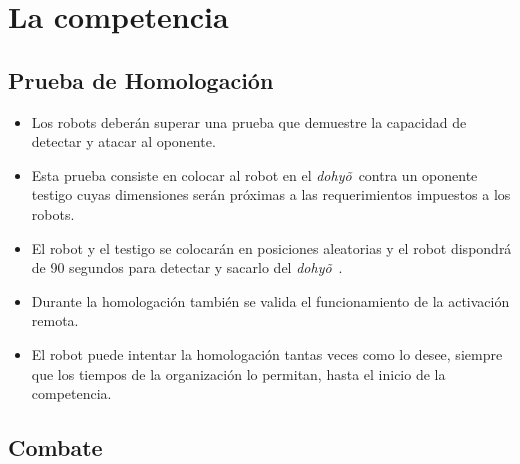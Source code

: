 \documentclass[a4paper,11pt]{article}
\newcommand{\dojo}{\emph{dohy\~{o}}~}
\begin{document}
\section*{La competencia}
\subsection*{Prueba de Homologación}
\begin{itemize}
  \item Los robots deberán superar una prueba que demuestre la capacidad de detectar y atacar al oponente.
  \item Esta prueba consiste en colocar al robot en el \dojo contra un oponente testigo cuyas dimensiones serán próximas a las requerimientos impuestos a los robots.
  \item El robot y el testigo se colocarán en posiciones aleatorias y el robot dispondrá de 90 segundos para detectar y sacarlo del \dojo.
  \item Durante la homologación también se valida el funcionamiento de la activación remota.
  \item El robot puede intentar la homologación tantas veces como lo desee, siempre que los tiempos de la organización lo permitan, hasta el inicio de la competencia.
\end{itemize}

\subsection*{Combate}
\end{document}

